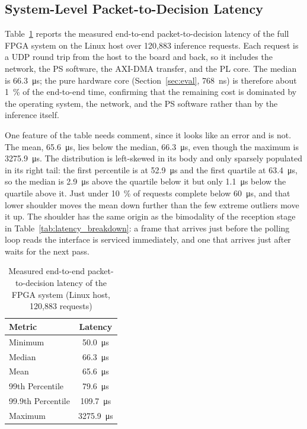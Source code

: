 \documentclass[final,5p,times,twocolumn]{elsarticle}
\begin{document}
\subsection{System-Level Packet-to-Decision Latency}
Table~\ref{tab:latency_metrics} reports the measured end-to-end
packet-to-decision latency of the full FPGA system on the Linux host over
120{,}883 inference requests. Each request is a UDP round trip from the host to
the board and back, so it includes the network, the PS software, the AXI-DMA
transfer, and the PL core. The median is \SI{66.3}{\micro\second}; the pure
hardware core (Section~\ref{sec:eval}, \SI{768}{\nano\second}) is therefore
about \SI{1}{\percent} of the end-to-end time, confirming that the remaining
cost is dominated by the operating system, the network, and the PS software
rather than by the inference itself.

One feature of the table needs comment, since it looks like an error and is not.
The mean, \SI{65.6}{\micro\second}, lies below the median,
\SI{66.3}{\micro\second}, even though the maximum is \SI{3275.9}{\micro\second}.
The distribution is left-skewed in its body and only sparsely populated in its
right tail: the first percentile is at \SI{52.9}{\micro\second} and the first
quartile at \SI{63.4}{\micro\second}, so the median is \SI{2.9}{\micro\second}
above the quartile below it but only \SI{1.1}{\micro\second} below the quartile
above it. Just under \SI{10}{\percent} of requests complete below
\SI{60}{\micro\second}, and that lower shoulder moves the mean down further than
the few extreme outliers move it up. The shoulder has the same origin as the
bimodality of the reception stage in Table~\ref{tab:latency_breakdown}: a frame
that arrives just before the polling loop reads the interface is serviced
immediately, and one that arrives just after waits for the next pass.

\begin{table}[htbp]
\centering
\caption{Measured end-to-end packet-to-decision latency of the FPGA system
(Linux host, 120{,}883 requests)}
\label{tab:latency_metrics}
\begin{tabular}{lc}
\toprule
Metric & Latency \\
\midrule
Minimum & \SI{50.0}{\micro\second} \\
Median & \SI{66.3}{\micro\second} \\
Mean & \SI{65.6}{\micro\second} \\
99th Percentile & \SI{79.6}{\micro\second} \\
99.9th Percentile & \SI{109.7}{\micro\second} \\
Maximum & \SI{3275.9}{\micro\second} \\
\bottomrule
\end{tabular}
\end{table}
\end{document}
